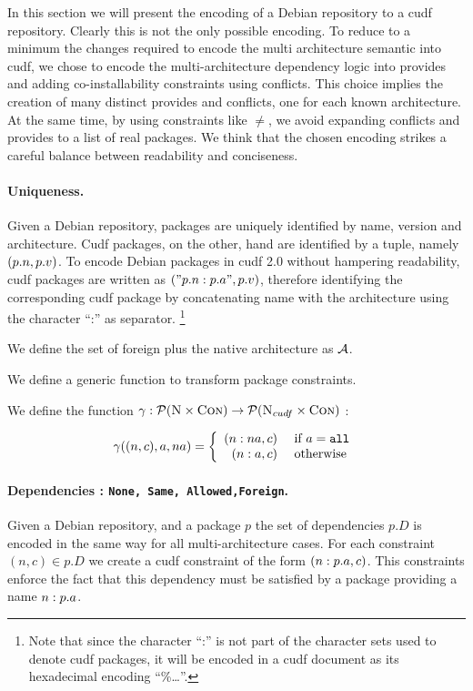 In this section we will present the encoding of a Debian repository to
a cudf repository. Clearly this is not the only possible encoding. To
reduce to a minimum the changes required to encode the multi
architecture semantic into cudf, we chose to encode the
multi-architecture dependency logic into provides and adding
co-installability constraints using conflicts. This choice implies the
creation of many distinct provides and conflicts, one for each
known architecture. At the same time, by using constraints like
$\neq$, we avoid expanding conflicts and provides to a list of real
packages. We think that the chosen encoding strikes a careful balance
between readability and conciseness.

\paragraph{Uniqueness.}
Given a Debian repository, packages are uniquely identified by name,
version and architecture. Cudf packages, on the other, hand are
identified by a tuple, namely $(\name{p},\version{p})$. To encode
Debian packages in cudf 2.0 without hampering readability, cudf
packages are written as $("\name{p}:\arch{p}",\version{p})$, therefore
identifying the corresponding cudf package by concatenating name with
the architecture using the character ``:'' as separator.
\footnote{Note that since the character ``:'' is not part of the
character sets used to denote cudf packages, it will be encoded in a
cudf document as its hexadecimal encoding ``\%\ldots''.}

We define the set of foreign plus the native architecture as $\cal{A}$.

We define a generic function to transform package constraints.
\begin{definition}
  We define the function 
  $\gamma : \power{\names\times\con} \rightarrow \power{\names_{cudf}\times\con}$ :

  \[
    \gamma ((n,c),a,na) = \left\{ 
      \begin{array}{rl}
        (n:na,c) & \mbox{ if } a = \tt{all} \\
        (n:a,c)  & \mbox{ otherwise }
      \end{array} 
    \right.
  \]
\end{definition}

\paragraph{Dependencies : \texttt{None, Same, Allowed,Foreign}.}
Given a Debian repository, and a package $p$ the set of dependencies
$p.D$ is encoded in the same way for all multi-architecture cases. For
each constraint $(n,c) \in p.D$ we create a cudf constraint of the
form $(n:\arch{p},c)$. This constraints enforce the fact that this
dependency must be satisfied by a package providing a name
$n:\arch{p}$.

